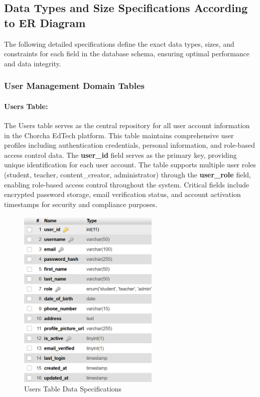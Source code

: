 \documentclass[12pt,a4paper,oneside]{book}
\begin{document}
\newpage
\subsection{Data Types and Size Specifications According to ER Diagram}

The following detailed specifications define the exact data types, sizes, and constraints for each field in the database schema, ensuring optimal performance and data integrity.

\subsubsection{User Management Domain Tables}

\paragraph{Users Table:}
The Users table serves as the central repository for all user account information in the Chorcha EdTech platform. This table maintains comprehensive user profiles including authentication credentials, personal information, and role-based access control data. The \textbf{user\_id} field serves as the primary key, providing unique identification for each user account. The table supports multiple user roles (student, teacher, content\_creator, administrator) through the \textbf{user\_role} field, enabling role-based access control throughout the system. Critical fields include encrypted password storage, email verification status, and account activation timestamps for security and compliance purposes.

\begin{figure}[H]
\centering
\includegraphics[width=0.6\textwidth]{assets/DBTable/Table4.2.png}
\caption{Users Table Data Specifications}
\label{table:users}
\end{figure}
\end{document}
